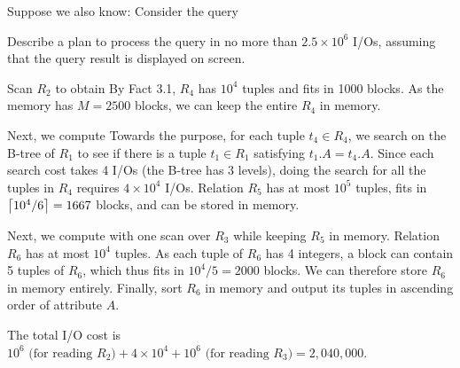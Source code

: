  Suppose we also know:
Consider the query



\noindent Describe a plan to process the query in no more than $2.5 \times 10^6$ I/Os, assuming that the query result is displayed on screen.


\begin{sol}
    Scan $R_2$ to obtain
    By Fact 3.1, $R_4$ has $10^4$ tuples and fits in 1000 blocks. As the memory has $M = 2500$ blocks, we can keep the entire $R_4$ in memory.

    \vgap

    Next, we compute
    Towards the purpose, for each tuple $t_4 \in R_4$, we search on the B-tree of $R_1$ to see if there is a tuple $t_1 \in R_1$ satisfying $t_1.A = t_4.A$. Since each search cost takes 4 I/Os (the B-tree has 3 levels), doing the search for all the tuples in $R_4$ requires $4 \times 10^4$ I/Os. Relation $R_5$ has at most $10^5$ tuples, fits in $\left \lceil 10^4 / 6 \right \rceil = 1667$ blocks, and can be stored in memory.

    \vgap

    Next, we compute
    with one scan over $R_3$ while keeping $R_5$ in memory. Relation $R_6$ has at most $10^4$ tuples. As each tuple of $R_6$ has 4 integers, a block can contain 5 tuples of $R_6$, which thus fits in $10^4 / 5 = 2000$ blocks. We can therefore store $R_6$ in memory entirely.
    Finally, sort $R_6$ in memory and output its tuples in ascending order of attribute $A$.

    \vgap

    The total I/O cost is $10^6 \text{ (for reading $R_2$)} + 4 \times 10^4 + 10^6 \text{ (for reading $R_3$)} = 2,040,000$.
\end{sol}

